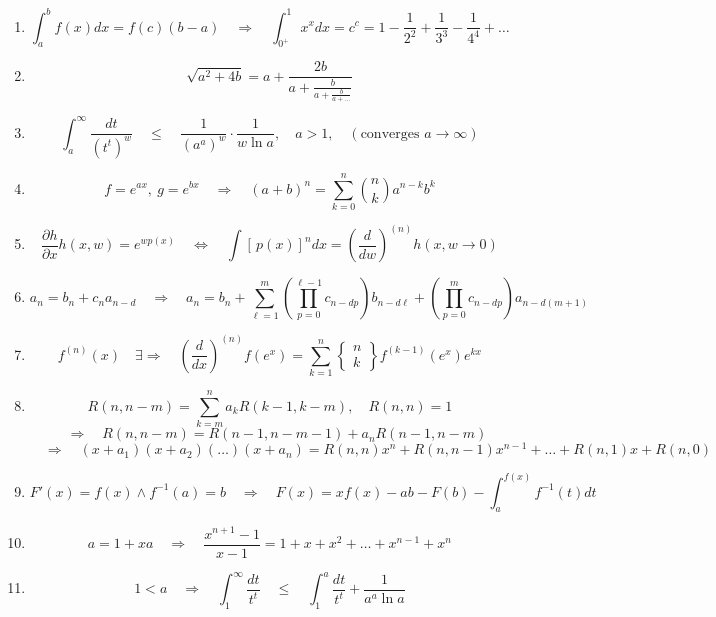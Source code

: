 \documentclass[twoside]{article}
\begin{document}
\begin{enumerate}
\item
$$ \int_a^bf(x)dx = f(c)(b-a) \quad\Longrightarrow\quad \int_{0^+}^1x^xdx = c^c = 1-\frac{1}{2^2}+\frac{1}{3^3}-\frac{1}{4^4}+\ldots $$

\item
$$ \sqrt{a^2+4b} = a + \frac{2b}{a + \frac{b}{a + \frac{b}{a + \ldots}}} $$

\item
$$ \int_a^\infty\frac{dt}{(t^t)^w} \quad\le\quad \frac{1}{(a^a)^w}\cdot\frac{1}{w\ln a},\quad a > 1,\quad (\mbox{converges }a\to\infty) $$

\item
$$ f = e^{ax},\ g = e^{bx} \quad\Longrightarrow\quad (a+b)^n = \sum_{k=0}^n{n \choose k}a^{n-k}b^k $$

\item
$$ \frac{\partial h}{\partial x}h(x,w) = e^{wp(x)}
	\quad\Longleftrightarrow\quad \int[\,p(x)]^ndx = \left(\frac{d}{dw}\right)^{(n)}h(x, w\to 0) $$

\item
$$ a_n = b_n + c_na_{n-d} \quad\Longrightarrow\quad
	a_n = b_n + \sum_{\ell=1}^m\left(\prod_{p=0}^{\ell-1}c_{n-dp}\right)b_{n-d\ell}
	+ \left(\prod_{p=0}^mc_{n-dp}\right)a_{n-d(m+1)} $$

\item
$$ f^{(n)}(x) \quad\exists\Longrightarrow\quad \left(\frac{d}{dx}\right)^{(n)}f(e^x)
	= \sum_{k=1}^n\left\{\!\!\!\begin{array}{c} n \\ k\end{array}\!\!\!\right\}f^{(k-1)}(e^x)e^{kx} $$

\item
$$ R(n,n-m) = \sum_{k=m}^na_kR(k-1, k-m),\quad R(n,n) = 1 $$
$$ \quad\Longrightarrow\quad R(n,n-m) = R(n-1, n-m-1) + a_nR(n-1, n-m) $$
$$ \quad\Longrightarrow\quad (x+a_1)(x+a_2)(\ldots)(x+a_n) = R(n, n)x^n + R(n, n-1)x^{n-1} + \ldots + R(n,1)x + R(n,0) $$

\item
$$ F'(x) = f(x) \wedge f^{-1}(a) = b \quad\Longrightarrow\quad F(x) = xf(x)-ab-F(b)-\int_a^{f(x)}f^{-1}(t)dt $$

\item
$$ a = 1+xa \quad\Longrightarrow\quad \frac{x^{n+1}-1}{x-1} = 1+x+x^2+\ldots+x^{n-1}+x^n $$

\item
$$ 1 < a \quad\Longrightarrow\quad \int_1^\infty\frac{dt}{t^t} \quad\le\quad \int_1^a\frac{dt}{t^t} + \frac{1}{a^a\ln a} $$


\end{enumerate}
\end{document}
